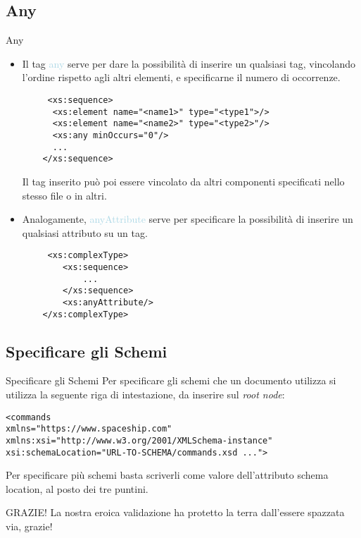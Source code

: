 \documentclass{beamer}
\begin{document}
	\subsection{Any}
	\begin{frame}[containsverbatim]{Any}
	\begin{itemize}
	\item Il tag \textcolor{lightblue}{any} serve per dare la possibilità di inserire un qualsiasi tag, vincolando l'ordine rispetto agli altri elementi, e specificarne il numero di occorrenze.
	\begin{lstlisting}
	 <xs:sequence>
      <xs:element name="<name1>" type="<type1">/>
      <xs:element name="<name2>" type="<type2>"/>
      <xs:any minOccurs="0"/>
      ...
    </xs:sequence>
	\end{lstlisting}
	Il tag inserito può poi essere vincolato da altri componenti specificati nello stesso file o in altri.
	\end{itemize}
	\end{frame}
	\begin{frame}[containsverbatim]
	\begin{itemize}
	\item Analogamente, \textcolor{lightblue}{anyAttribute} serve per specificare la possibilità di inserire un qualsiasi attributo su un tag. 
	\begin{lstlisting}
	 <xs:complexType>
    	<xs:sequence>
      		...
   		</xs:sequence>
    	<xs:anyAttribute/>
  	</xs:complexType>
	\end{lstlisting}
	\end{itemize}
	\end{frame}
	\subsection{Specificare gli Schemi}
	\begin{frame}[containsverbatim]{Specificare gli Schemi}
	Per specificare gli schemi che un documento utilizza si utilizza la seguente riga di intestazione, da inserire sul \textit{root node}:
\begin{lstlisting}
<commands
xmlns="https://www.spaceship.com"
xmlns:xsi="http://www.w3.org/2001/XMLSchema-instance"
xsi:schemaLocation="URL-TO-SCHEMA/commands.xsd ...">
\end{lstlisting}
Per specificare più schemi basta scriverli come valore dell'attributo schema location, al posto dei tre puntini.
\end{frame}
\begin{frame}
\begin{block}{GRAZIE!}
La nostra eroica validazione ha protetto la terra dall'essere spazzata via, grazie!
\end{block}
\end{frame}
\end{document}
